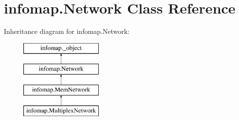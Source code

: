 \hypertarget{classinfomap_1_1Network}{}\section{infomap.\+Network Class Reference}
\label{classinfomap_1_1Network}
Inheritance diagram for infomap.\+Network\+:\begin{figure}[H]
\begin{center}
\leavevmode
\includegraphics[height=4.000000cm]{classinfomap_1_1Network}
\end{center}
\end{figure}
